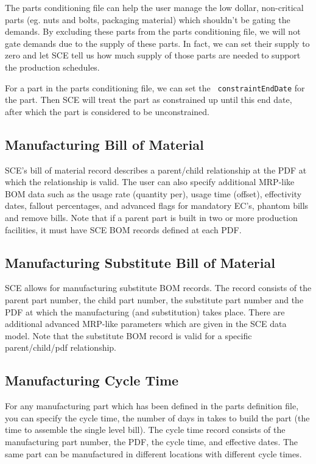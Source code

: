 The parts conditioning file can help the user manage the low dollar,
non-critical parts (eg. nuts and bolts, packaging material) which
shouldn't be gating the demands.  By excluding these parts from the
parts conditioning file, we will not gate demands due to the supply of
these parts.  In fact, we can set their supply to zero and let SCE
tell us how much supply of those parts are needed to support the
production schedules.

For a part in the parts conditioning file, we can set the {\tt
constraintEndDate} for the part.  Then SCE will treat the part as
constrained up until this end date, after which the part is considered
to be unconstrained.

\subsection{Manufacturing Bill of Material}
SCE's bill of material record describes a parent/child relationship
at the PDF at which the relationship is valid.  The user can also
specify additional MRP-like BOM data such as the usage rate (quantity
per), usage time (offset), effectivity dates, fallout percentages, and
advanced flags for mandatory EC's, phantom bills and remove bills.
Note that if a parent part is built in two or more production
facilities, it must have SCE BOM records defined at each PDF.

\subsection{Manufacturing Substitute Bill of Material} 
SCE allows for manufacturing substitute BOM records.  The record
consists of the parent part number, the child part number, the
substitute part number and the PDF at which the manufacturing (and
substitution) takes place.  There are additional advanced MRP-like
parameters which are given in the SCE data model.  Note that the
substitute BOM record is valid for a specific parent/child/pdf
relationship.

\subsection{Manufacturing Cycle Time}
For any manufacturing part which has been defined in the parts
definition file, you can specify the cycle time, the number of days in
takes to build the part (the time to assemble the single level bill).
The cycle time record consists of the manufacturing part number, the
PDF, the cycle time, and effective dates.  The same part can be manufactured in
different locations with different cycle times.

